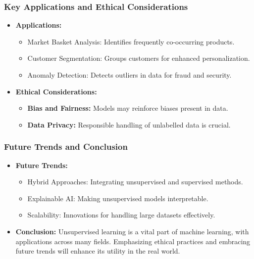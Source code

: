 \documentclass[aspectratio=169]{beamer}
\begin{document}
\begin{frame}[fragile]
    \frametitle{Key Applications and Ethical Considerations}
    
    \begin{itemize}
        \item \textbf{Applications:}
        \begin{itemize}
            \item Market Basket Analysis: Identifies frequently co-occurring products.
            \item Customer Segmentation: Groups customers for enhanced personalization.
            \item Anomaly Detection: Detects outliers in data for fraud and security.
        \end{itemize}
        \item \textbf{Ethical Considerations:}
        \begin{itemize}
            \item \textbf{Bias and Fairness:} Models may reinforce biases present in data.
            \item \textbf{Data Privacy:} Responsible handling of unlabelled data is crucial.
        \end{itemize}
    \end{itemize}
\end{frame}

\begin{frame}[fragile]
    \frametitle{Future Trends and Conclusion}

    \begin{itemize}
        \item \textbf{Future Trends:}
        \begin{itemize}
            \item Hybrid Approaches: Integrating unsupervised and supervised methods.
            \item Explainable AI: Making unsupervised models interpretable.
            \item Scalability: Innovations for handling large datasets effectively.
        \end{itemize}
        \item \textbf{Conclusion:} 
        Unsupervised learning is a vital part of machine learning, with applications across many fields. Emphasizing ethical practices and embracing future trends will enhance its utility in the real world.
    \end{itemize}
\end{frame}
\end{document}
